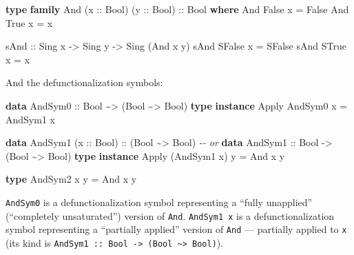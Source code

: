 \documentclass[]{article}
\newenvironment{Shaded}{}{}
\newcommand{\CommentTok}[1]{\textcolor[rgb]{0.38,0.63,0.69}{\textit{#1}}}
\newcommand{\DataTypeTok}[1]{\textcolor[rgb]{0.56,0.13,0.00}{#1}}
\newcommand{\KeywordTok}[1]{\textcolor[rgb]{0.00,0.44,0.13}{\textbf{#1}}}
\newcommand{\NormalTok}[1]{#1}
\newcommand{\OperatorTok}[1]{\textcolor[rgb]{0.40,0.40,0.40}{#1}}
\newcommand{\OtherTok}[1]{\textcolor[rgb]{0.00,0.44,0.13}{#1}}
\begin{document}
\begin{Shaded}
\begin{Highlighting}[]
\KeywordTok{type} \KeywordTok{family} \DataTypeTok{And}\NormalTok{ (}\OtherTok{x ::} \DataTypeTok{Bool}\NormalTok{) (}\OtherTok{y ::} \DataTypeTok{Bool}\NormalTok{)}\OtherTok{ ::} \DataTypeTok{Bool} \KeywordTok{where}
    \DataTypeTok{And} \DataTypeTok{\textquotesingle{}False}\NormalTok{ x }\OtherTok{=} \DataTypeTok{\textquotesingle{}False}
    \DataTypeTok{And} \DataTypeTok{\textquotesingle{}True}\NormalTok{  x }\OtherTok{=}\NormalTok{ x}

\OtherTok{sAnd ::} \DataTypeTok{Sing}\NormalTok{ x }\OtherTok{{-}>} \DataTypeTok{Sing}\NormalTok{ y }\OtherTok{{-}>} \DataTypeTok{Sing}\NormalTok{ (}\DataTypeTok{And}\NormalTok{ x y)}
\NormalTok{sAnd }\DataTypeTok{SFalse}\NormalTok{ x }\OtherTok{=} \DataTypeTok{SFalse}
\NormalTok{sAnd }\DataTypeTok{STrue}\NormalTok{  x }\OtherTok{=}\NormalTok{ x}
\end{Highlighting}
\end{Shaded}

And the defunctionalization symbols:

\begin{Shaded}
\begin{Highlighting}[]
\KeywordTok{data} \DataTypeTok{AndSym0}\OtherTok{ ::} \DataTypeTok{Bool} \OperatorTok{\textasciitilde{}>}\NormalTok{ (}\DataTypeTok{Bool} \OperatorTok{\textasciitilde{}>} \DataTypeTok{Bool}\NormalTok{)}
\KeywordTok{type} \KeywordTok{instance} \DataTypeTok{Apply} \DataTypeTok{AndSym0}\NormalTok{ x }\OtherTok{=} \DataTypeTok{AndSym1}\NormalTok{ x}

\KeywordTok{data} \DataTypeTok{AndSym1}\NormalTok{ (}\OtherTok{x ::} \DataTypeTok{Bool}\NormalTok{)}\OtherTok{ ::}\NormalTok{ (}\DataTypeTok{Bool} \OperatorTok{\textasciitilde{}>} \DataTypeTok{Bool}\NormalTok{)}
\CommentTok{{-}{-} or}
\KeywordTok{data} \DataTypeTok{AndSym1}\OtherTok{ ::} \DataTypeTok{Bool} \OtherTok{{-}>}\NormalTok{ (}\DataTypeTok{Bool} \OperatorTok{\textasciitilde{}>} \DataTypeTok{Bool}\NormalTok{)}
\KeywordTok{type} \KeywordTok{instance} \DataTypeTok{Apply}\NormalTok{ (}\DataTypeTok{AndSym1}\NormalTok{ x) y }\OtherTok{=} \DataTypeTok{And}\NormalTok{ x y}

\KeywordTok{type} \DataTypeTok{AndSym2}\NormalTok{ x y }\OtherTok{=} \DataTypeTok{And}\NormalTok{ x y}
\end{Highlighting}
\end{Shaded}

\texttt{AndSym0} is a defunctionalization symbol representing a ``fully
unapplied'' (``completely unsaturated'') version of \texttt{And}.
\texttt{AndSym1\ x} is a defunctionalization symbol representing a ``partially
applied'' version of \texttt{And} --- partially applied to \texttt{x} (its kind
is
\texttt{AndSym1\ ::\ Bool\ -\textgreater{}\ (Bool\ \textasciitilde{}\textgreater{}\ Bool)}).
\end{document}
